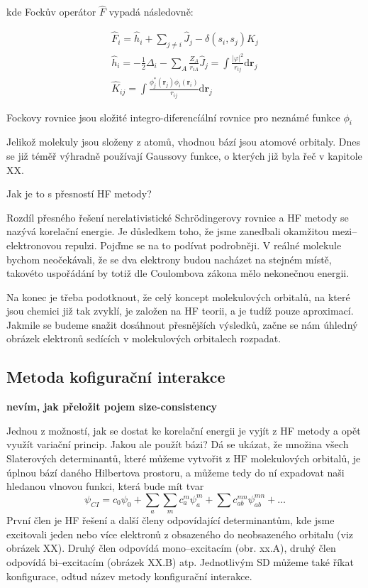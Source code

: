 kde Fockův operátor $\hat{F}$ vypadá následovně:

\begin{eqnarray}
\hat{F}_i = \hat{h}_i+\sum_{j\neq i} \hat{J}_j - \delta(s_i,s_j) \hat{K}_j \\
\hat{h}_i = -\frac{1}{2}\Delta_i - \sum_{A}\frac{Z_A}{r_{iA}}
\hat{J}_j=\int \frac{|\varphi |^2}{r_{ij}}\mathrm{d}\textbf{r}_j \\
\hat{K}_{ij} = \int \frac{\phi_j^*(\mathbf{r}_j)\phi_i(\mathbf{r}_i)}{r_{ij}}\mathrm{d}\textbf{r}_j
\end{eqnarray}

Fockovy rovnice jsou složité integro-diferencíální rovnice pro neznámé funkce $\phi_i$

Jelikož molekuly jsou složeny z atomů, vhodnou bází jsou atomové orbitaly.
Dnes se již téměř výhradně používají Gaussovy funkce, o kterých již byla řeč v kapitole XX.


Jak je to s přesností HF metody?

Rozdíl přesného řešení nerelativistické Schr\"{o}dingerovy rovnice a HF metody se nazývá korelační energie. Je důsledkem toho, že jsme zanedbali okamžitou mezi--elektronovou repulzi. Pojďme se na to podívat podrobněji. V reálné molekule bychom neočekávali, že se dva elektrony budou nacházet na stejném místě, takovéto uspořádání by totiž dle Coulombova zákona mělo nekonečnou energii. 


Na konec je třeba podotknout, že celý koncept molekulových orbitalů, na které jsou chemici již tak zvyklí, je založen na HF teorii, a je tudíž pouze aproximací. Jakmile se budeme snažit dosáhnout přesnějších výsledků, začne se nám úhledný obrázek elektronů sedících v molekulových orbitalech rozpadat.

\subsection{Metoda kofigurační interakce}

\textbf{nevím, jak přeložit pojem size-consistency}

Jednou z možností, jak se dostat ke korelační energii je vyjít z HF metody a opět využít variační princip. Jakou ale použít bázi? Dá se ukázat, že množina všech Slaterových determinantů, které můžeme vytvořit z HF molekulových orbitalů, je úplnou bází daného Hilbertova prostoru, a můžeme tedy do ní expadovat naši hledanou vlnovou funkci, která bude mít tvar
\begin{equation}
\psi_{CI}=c_0\psi_0+\sum_a\sum_m c_a^m\psi_a^m+\sum c_{ab}^{mn}\psi_{ab}^{mn}+\dots
\label{rov:CIrozvoj}
\end{equation}
První člen je HF řešení a další členy odpovídající determinantům, kde jsme excitovali jeden nebo více elektronů z obsazeného do neobsazeného orbitalu (viz obrázek XX). Druhý člen odpovídá mono--excitacím (obr. xx.A), druhý člen odpovídá bi--excitacím (obrázek XX.B) atp. Jednotlivým SD můžeme také říkat konfigurace, odtud název metody konfigurační interakce.

